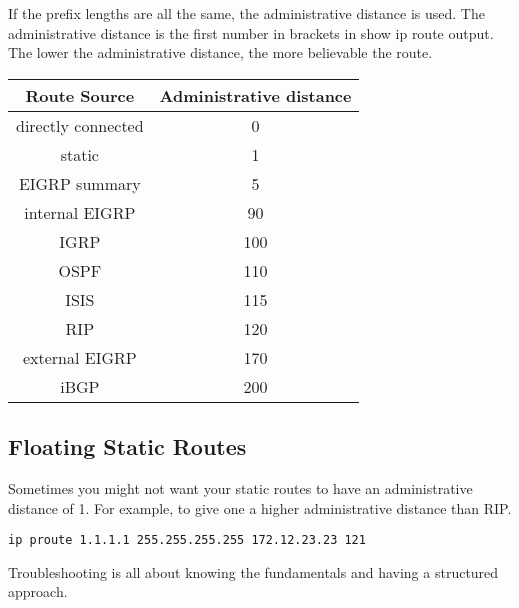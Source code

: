 \documentclass{article}
\begin{document}
If the prefix lengths are all the same, the administrative distance is used.
The administrative distance is the first number in brackets in show ip route
output. The lower the administrative distance, the more believable the
route.\\

\begin{tabular}{ | c | c | }
\hline
Route Source & Administrative distance \\ \hline
directly connected &   0 \\ \hline
static             &   1 \\ \hline
EIGRP summary      &   5 \\ \hline
internal EIGRP     &  90 \\ \hline
IGRP               & 100 \\ \hline
OSPF               & 110 \\ \hline
ISIS               & 115 \\ \hline
RIP                & 120 \\ \hline
external EIGRP     & 170 \\ \hline
iBGP               & 200 \\ \hline
\end{tabular}

\subsection{Floating Static Routes}

Sometimes you might not want your static routes to have an administrative
distance of 1. For example, to give one a higher administrative distance than
RIP.

\begin{verbatim}
ip proute 1.1.1.1 255.255.255.255 172.12.23.23 121
\end{verbatim}

Troubleshooting is all about knowing the fundamentals and having a structured
approach.
\end{document}

